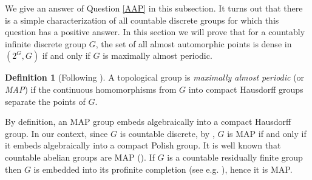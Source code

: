 \documentclass[11pt]{amsart}
\theoremstyle{definition}
\newtheorem{definition}[theorem]{Definition}
\numberwithin{equation}{section}
\theoremstyle{definition}
\begin{document}
We give an answer of Question \ref{AAP} in this subsection. It turns out that there is a simple characterization of all countable discrete groups for which this question has a positive answer. In this section we will prove that for a countably infinite discrete group $G$, the set of all almost automorphic points is dense in $(2^G, G)$ if and only if $G$ is maximally almost periodic. 

\begin{definition}[{Following \cite{vN}}] A topological group is {\em maximally almost periodic} (or {\em MAP}) if the continuous homomorphisms from $G$ into compact Hausdorff groups separate the points of $G$.
\end{definition}

By definition, an MAP group embeds algebraically into a compact Hausdorff group. In our context, since $G$ is countable discrete, by \cite[Section 2.20]{MZ}, $G$ is MAP if and only if it embeds algebraically into a compact Polish group. It is well known that countable abelian groups are MAP (\cite[Theorem 36]{vN}). If $G$ is a countable residually finite group then $G$ is embedded into its profinite completion (see e.g. \cite[Section 3.2]{RZbook}), hence it is MAP. 


\end{document}
